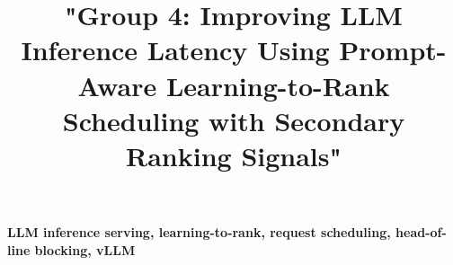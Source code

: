 \documentclass[conference]{IEEEtran}
\begin{document}
\title{"Group 4: Improving LLM Inference Latency Using Prompt-Aware Learning-to-Rank Scheduling with Secondary Ranking Signals"}

\author{
\and
{}
}

\maketitle


\begin{IEEEkeywords}
\textbf{LLM inference serving, learning-to-rank, request scheduling, head-of-line blocking, vLLM}
\end{IEEEkeywords}


\FloatBarrier

\FloatBarrier

\FloatBarrier

\FloatBarrier

\FloatBarrier

\FloatBarrier

\FloatBarrier

\FloatBarrier

\label{sec:references}


\end{document}
